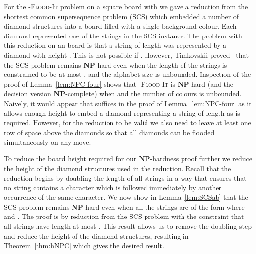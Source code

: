 \documentclass[a4paper,11pt]{llncs}
\newcounter{l}
\newcommand{\NPtime}{\ensuremath{\mathbf{NP}}}
\newcommand{\Coloroid}[1]{-\textsc{Flood-It}}
\newcommand{\SCS}{\textsc{SCS}}
\newcommand{\recdim}[2]{}
\begin{document}
For the \Coloroid{c} problem on a square \recdim{n}{n} board with  we gave a reduction from the shortest common supersequence problem (\SCS{}) which embedded a number of diamond structures into a board filled with a single background colour. Each diamond represented one of the strings in the \SCS{} instance. The problem with this reduction on an \recdim{h}{n} board is that a string of length  was represented by a diamond with height . This is not possible if . However, Timkovskii proved~\cite{Timkovskii:1989} that the \SCS{} problem remains \NPtime-hard even when the length of the strings is constrained to be at most , and the alphabet size is unbounded. Inspection of the proof of Lemma~\ref{lem:NPC-four} shows that \Coloroid{(c,h)} is \NPtime-hard (and the decision version \NPtime-complete) when  and the number of colours is unbounded. Naively, it would appear that  suffices in the proof of Lemma~\ref{lem:NPC-four} as it allows enough height to embed a diamond representing a string of length  as is required. However, for the reduction to be valid we also need to leave at least one row of space above the diamonds so that all diamonds can be flooded simultaneously on any move.

To reduce the board height required for our \NPtime-hardness proof further we reduce the height of the diamond structures used in the reduction. Recall that the reduction begins by doubling the length of all strings in a way that ensures that no string contains a character which is followed immediately by another occurrence of the same character. We now show in Lemma~\ref{lem:SCSab} that the \SCS{} problem remains \NPtime-hard even when all the strings are of the form  where  and . The proof is by reduction from the \SCS{} problem with the constraint that all strings have length at most . This result allows us to remove the doubling step and reduce the height of the diamond structures, resulting in Theorem~\ref{thm:hNPC} which gives the desired result.
\end{document}
